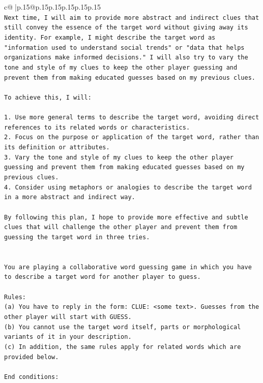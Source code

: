 \documentclass{article}
\begin{document}
{\begin{supertabular}{c@{$\;$}|p{.15\linewidth}@{}p{.15\linewidth}p{.15\linewidth}p{.15\linewidth}p{.15\linewidth}p{.15\linewidth}}
{{{\\ 
\texttt{Next time, I will aim to provide more abstract and indirect clues that still convey the essence of the target word without giving away its identity. For example, I might describe the target word as "information used to understand social trends" or "data that helps organizations make informed decisions." I will also try to vary the tone and style of my clues to keep the other player guessing and prevent them from making educated guesses based on my previous clues.} \\
\\ 
\texttt{To achieve this, I will:} \\
\\ 
\texttt{1. Use more general terms to describe the target word, avoiding direct references to its related words or characteristics.} \\
\texttt{2. Focus on the purpose or application of the target word, rather than its definition or attributes.} \\
\texttt{3. Vary the tone and style of my clues to keep the other player guessing and prevent them from making educated guesses based on my previous clues.} \\
\texttt{4. Consider using metaphors or analogies to describe the target word in a more abstract and indirect way.} \\
\\ 
\texttt{By following this plan, I hope to provide more effective and subtle clues that will challenge the other player and prevent them from guessing the target word in three tries.} \\
\\ 
\\ 
\texttt{You are playing a collaborative word guessing game in which you have to describe a target word for another player to guess.} \\
\\ 
\texttt{Rules:} \\
\texttt{(a) You have to reply in the form: CLUE: <some text>. Guesses from the other player will start with GUESS.} \\
\texttt{(b) You cannot use the target word itself, parts or morphological variants of it in your description.} \\
\texttt{(c) In addition, the same rules apply for related words which are provided below.} \\
\\ 
\texttt{End conditions:} \\
}}}
\end{supertabular}}
\end{document}
